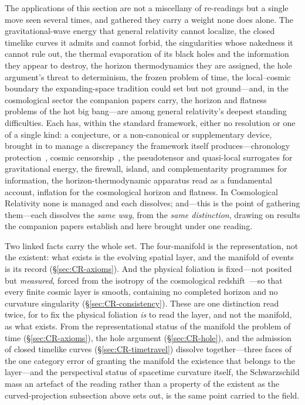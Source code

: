 \documentclass[11pt,a4paper]{article}
\theoremstyle{plain}
\theoremstyle{definition}
\theoremstyle{remark}
\begin{document}
The applications of this section are not a miscellany of re-readings but a single move seen several times, and gathered they carry a weight none does alone. The gravitational-wave energy that general relativity cannot localize, the closed timelike curves it admits and cannot forbid, the singularities whose nakedness it cannot rule out, the thermal evaporation of its black holes and the information they appear to destroy, the horizon thermodynamics they are assigned, the hole argument's threat to determinism, the frozen problem of time, the local--cosmic boundary the expanding-space tradition could set but not ground---and, in the cosmological sector the companion papers carry, the horizon and flatness problems of the hot big bang---are among general relativity's deepest standing difficulties. Each has, within the standard framework, either no resolution or one of a single kind: a conjecture, or a non-canonical or supplementary device, brought in to manage a discrepancy the framework itself produces---chronology protection~\cite{Hawking1992}, cosmic censorship~\cite{Penrose1969}, the pseudotensor and quasi-local surrogates for gravitational energy, the firewall, island, and complementarity programmes for information, the horizon-thermodynamic apparatus read as a fundamental account, inflation for the cosmological horizon and flatness. In Cosmological Relativity none is managed and each dissolves; and---this is the point of gathering them---each dissolves the \emph{same way}, from the \emph{same distinction}, drawing on results the companion papers establish and here brought under one reading.

Two linked facts carry the whole set. The four-manifold is the representation, not the existent: what exists is the evolving spatial layer, and the manifold of events is its record (\S\ref{sec:CR-axioms}). And the physical foliation is fixed---not posited but \emph{measured}, forced from the isotropy of the cosmological redshift~\cite{JanzenModernParallax}---so that every finite cosmic layer is smooth, containing no completed horizon and no curvature singularity (\S\ref{sec:CR-consistency}). These are one distinction read twice, for to fix the physical foliation \emph{is} to read the layer, and not the manifold, as what exists. From the representational status of the manifold the problem of time (\S\ref{sec:CR-axioms}), the hole argument (\S\ref{sec:CR-hole}), and the admission of closed timelike curves (\S\ref{sec:CR-timetravel}) dissolve together---three faces of the one category error of granting the manifold the existence that belongs to the layer---and the perspectival status of spacetime curvature itself, the Schwarzschild mass an artefact of the reading rather than a property of the existent as the curved-projection subsection above sets out, is the same point carried to the field.
\end{document}

